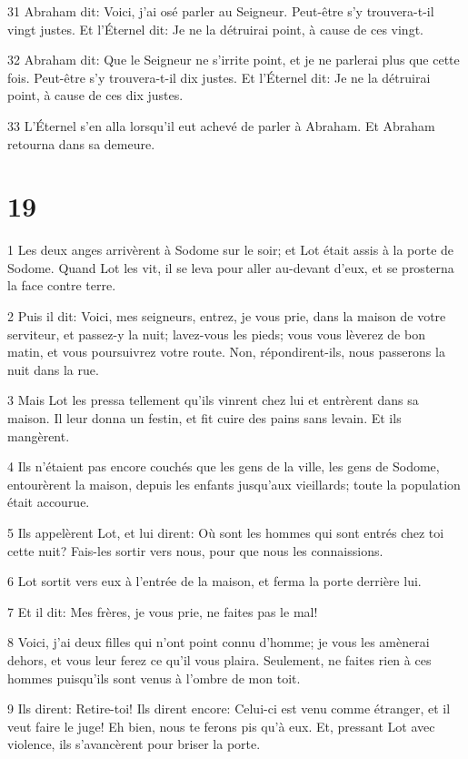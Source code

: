 \par 31 Abraham dit: Voici, j'ai osé parler au Seigneur. Peut-être s'y trouvera-t-il vingt justes. Et l'Éternel dit: Je ne la détruirai point, à cause de ces vingt.
\par 32 Abraham dit: Que le Seigneur ne s'irrite point, et je ne parlerai plus que cette fois. Peut-être s'y trouvera-t-il dix justes. Et l'Éternel dit: Je ne la détruirai point, à cause de ces dix justes.
\par 33 L'Éternel s'en alla lorsqu'il eut achevé de parler à Abraham. Et Abraham retourna dans sa demeure.

\chapter{19}

\par 1 Les deux anges arrivèrent à Sodome sur le soir; et Lot était assis à la porte de Sodome. Quand Lot les vit, il se leva pour aller au-devant d'eux, et se prosterna la face contre terre.
\par 2 Puis il dit: Voici, mes seigneurs, entrez, je vous prie, dans la maison de votre serviteur, et passez-y la nuit; lavez-vous les pieds; vous vous lèverez de bon matin, et vous poursuivrez votre route. Non, répondirent-ils, nous passerons la nuit dans la rue.
\par 3 Mais Lot les pressa tellement qu'ils vinrent chez lui et entrèrent dans sa maison. Il leur donna un festin, et fit cuire des pains sans levain. Et ils mangèrent.
\par 4 Ils n'étaient pas encore couchés que les gens de la ville, les gens de Sodome, entourèrent la maison, depuis les enfants jusqu'aux vieillards; toute la population était accourue.
\par 5 Ils appelèrent Lot, et lui dirent: Où sont les hommes qui sont entrés chez toi cette nuit? Fais-les sortir vers nous, pour que nous les connaissions.
\par 6 Lot sortit vers eux à l'entrée de la maison, et ferma la porte derrière lui.
\par 7 Et il dit: Mes frères, je vous prie, ne faites pas le mal!
\par 8 Voici, j'ai deux filles qui n'ont point connu d'homme; je vous les amènerai dehors, et vous leur ferez ce qu'il vous plaira. Seulement, ne faites rien à ces hommes puisqu'ils sont venus à l'ombre de mon toit.
\par 9 Ils dirent: Retire-toi! Ils dirent encore: Celui-ci est venu comme étranger, et il veut faire le juge! Eh bien, nous te ferons pis qu'à eux. Et, pressant Lot avec violence, ils s'avancèrent pour briser la porte.
